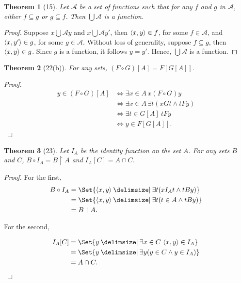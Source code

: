 \documentclass[12pt]{article}
\theoremstyle{plain}
\newtheorem*{exthm}{Theorem}
\theoremstyle{remark}
\theoremstyle{definition}
\theoremstyle{remark}
\providecommand\st{}
\newcommand\SetSymbol[1][]{%
  \nonscript\:#1\vert%
  \allowbreak%
  \nonscript\:
\mathopen{}}
\DeclarePairedDelimiter{\ang}{\langle}{\rangle}
\renewcommand\st{\SetSymbol[\delimsize]}
\renewcommand{\iff}{\Leftrightarrow}
\begin{document}
\begin{exthm}[15]
  Let $\mathscr{A}$ be a set of functions such that for any $f$ and $g$ in $\mathscr{A}$, either $f \subseteq g$ or $g \subseteq f$. Then $\bigcup \mathscr{A}$ is a function.
\end{exthm}
\begin{proof}
  Suppose $x \bigcup \mathscr{A} y$ and $x \bigcup \mathscr{A} y'$, then $\ang{x,y} \in f$, for some $f \in \mathscr{A}$, and $\ang{x, y'} \in g$, for some $g \in \mathscr{A}$. Without loss of generality, suppose $f \subseteq g$, then $\ang{x, y} \in g$. Since $g$ is a function, it follows $y = y'$. Hence, $\bigcup \mathscr{A}$ is a function.
\end{proof}

\begin{exthm}[22(b)]
  For any sets, $(F \circ G)[A] = F[G[A]]$.
\end{exthm}
\begin{proof}
  \begin{align*}
    y \in (F \circ G)[A] &\iff \exists x \in A\, x (F \circ G)y\\
                         &\iff \exists x \in A\, \exists t (xGt \land tFy)\\
                         &\iff \exists t \in G[A]\ tFy\\
                         &\iff y \in F[G[A]].
  \end{align*}
\end{proof}

\begin{exthm}[23]
  Let $I_A$ be the identity function on the set $A$. For any sets $B$ and $C$, $B \circ I_A = B \restriction A$ and $I_A[C] = A \cap C$.
\end{exthm}
\begin{proof}
  For the first,
  \begin{align*}
    B \circ I_A &= \Set{\ang{x,y} \st \exists t (xI_A t \land tBy)}\\
                &= \Set{\ang{x,y} \st \exists t (t \in A \land tBy)}\\
                &= B \restriction A.
  \end{align*}

For the second,

\begin{align*}
  I_A [C] &= \Set{y \st \exists x \in C\ \ang{x, y} \in I_A}\\
          &= \Set{y \st \exists y (y \in C \land y \in I_A)}\\
          &= A \cap C.
\end{align*}
\end{proof}
\end{document}
